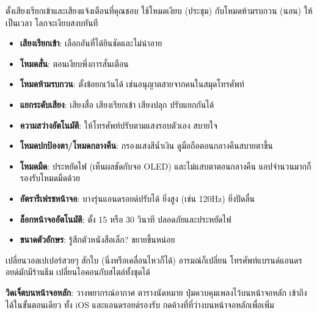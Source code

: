 


ตั้งเสียงเรียกเข้าและเสียงแจ้งเตือนที่คุณชอบ ใช้โหมดเงียบ (ประชุม) กับโหมดห้ามรบกวน (นอน) ให้เป็นเวลา โลกจะเงียบสงบทันที

\begin{itemize}
  \item \textbf{เสียงเรียกเข้า}: เลือกอันที่ได้ยินชัดและไม่น่าอาย
  \item \textbf{โหมดสั่น}: ตอนเงียบพึ่งการสั่นเตือน
  \item \textbf{โหมดห้ามรบกวน}: ตั้งข้อยกเว้นได้ เช่นอนุญาตสายจากคนในสมุดโทรศัพท์
  \item \textbf{แยกระดับเสียง}: เสียงสื่อ เสียงเรียกเข้า เสียงปลุก ปรับแยกกันได้
\end{itemize}


\begin{itemize}
  \item \textbf{ความสว่างอัตโนมัติ}: ให้โทรศัพท์ปรับตามแสงรอบตัวเอง สบายใจ
  \item \textbf{โหมดปกป้องตา/โหมดกลางคืน}: กรองแสงสีน้ำเงิน ดูมือถือตอนกลางคืนสบายตาขึ้น
  \item \textbf{โหมดมืด}: ประหยัดไฟ (เห็นผลชัดกับจอ OLED) และไม่แสบตาตอนกลางคืน แอปจำนวนมากก็รองรับโหมดมืดด้วย
  \item \textbf{อัตรารีเฟรชหน้าจอ}: บางรุ่นแอนดรอยด์ปรับได้ ยิ่งสูง (เช่น 120Hz) ยิ่งปัดลื่น
  \item \textbf{ล็อกหน้าจออัตโนมัติ}: ตั้ง 15 หรือ 30 วินาที ปลอดภัยและประหยัดไฟ
  \item \textbf{ขนาดตัวอักษร}: รู้สึกตัวหนังสือเล็ก? ขยายขึ้นหน่อย
\end{itemize}


เปลี่ยนวอลเปเปอร์สวยๆ สักใบ (นิ่งหรือเคลื่อนไหวก็ได้) อารมณ์ก็เปลี่ยน โทรศัพท์แบรนด์แอนดรอยด์มักมีร้านธีม เปลี่ยนไอคอนกับสไตล์ทั้งชุดได้

\textbf{วิดเจ็ตบนหน้าจอหลัก}: วางพยากรณ์อากาศ ตารางนัดหมาย ปุ่มควบคุมเพลงไว้บนหน้าจอหลัก เข้าถึงได้ในขั้นตอนเดียว ทั้ง iOS และแอนดรอยด์รองรับ กดค้างที่ที่ว่างบนหน้าจอหลักเพื่อเพิ่ม

